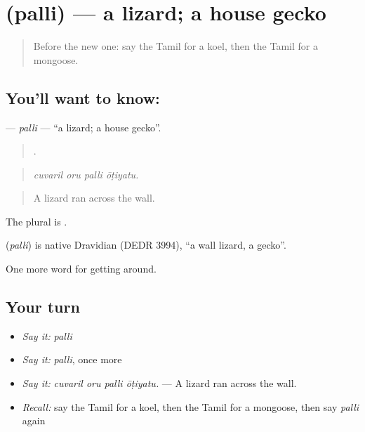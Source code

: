 \section[\texorpdfstring{\ta{பல்லி} (palli)}{பல்லி (palli)}]{ (palli) — a lizard; a house gecko}

\label{lesson:TA-C438-palli}



\begin{quote}
Before the new one: say the Tamil for a koel, then the Tamil for a mongoose.
\end{quote}

\subsection*{You'll want to know: }
\textbf{} — \emph{palli} — \textquotedblleft{}a lizard; a house gecko\textquotedblright{}.

\begin{quote}
   .
\end{quote}

\begin{quote}
\emph{cuvaril oru palli ōṭiyatu.}
\end{quote}

\begin{quote}
A lizard ran across the wall.
\end{quote}

The plural is .

\begin{cousinweb}
\textbf{} (\emph{palli}) is native Dravidian (DEDR 3994), \textquotedblleft{}a wall lizard, a gecko\textquotedblright{}.
\end{cousinweb}

\begin{grammarlens}[title={What you've built}]
One more word for getting around.
\end{grammarlens}

\subsection*{Your turn}
\begin{itemize}
\raggedright
  \item \emph{Say it:} \emph{palli}
  \item \emph{Say it:} \emph{palli}, once more
  \item \emph{Say it:} \emph{cuvaril oru palli ōṭiyatu.} — A lizard ran across the wall.
  \item \emph{Recall:} say the Tamil for a koel, then the Tamil for a mongoose, then say \emph{palli} again
\end{itemize}


